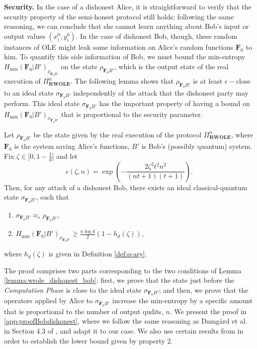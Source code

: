 \noindent\textbf{Security.} In the case of a dishonest Alice, it is straightforward to verify that the security property of the semi-honest protocol still holds; following the same reasoning, we can conclude that she cannot learn anything about Bob's input or output values $(x^0_i, y^0_i)$.  In the case of dishonest Bob, though, these random instances of OLE might leak some information on Alice's random functions $\mathbf{F}_0$ to him. To quantify this  side information of Bob, we must  bound the min-entropy $H_{\min}(\mathbf{F}_0|B')_{\rho_{\mathbf{F}_0 B'}}$ on the state $\rho_{\mathbf{F}_0 B'}$, which is the output state of the real execution of  $\Pi^n_{\textbf{RWOLE}}$. The following lemma shows that  $\rho_{\mathbf{F}_0 B'}$  is at least $\epsilon-$close to an ideal state $\sigma_{\mathbf{F}_0 B'}$ independently of the attack that the dishonest party may perform. This ideal state $\sigma_{\mathbf{F}_0 B'}$ has the important property of having a bound on $H_{\min}(\mathbf{F}_0|B')_{\sigma_{\mathbf{F}_0 B'}}$ that is proportional to the security parameter. 
\begin{lemma}
\label{lemma:wrole_dishonest_bob}

Let $\rho_{\mathbf{F}_0 B'}$ be the state given by the real execution of the protocol $\Pi^n_{\textbf{RWOLE}}$, where $\mathbf{F}_0$ is the system saving Alice's functions, $B'$ is Bob's (possibly quantum) system. Fix $\zeta \in ]0, 1-\frac{1}{d}]$ and let 
$$\epsilon(\zeta, n) = \exp( -\frac{2 \zeta^2t^2n^2}{(nt+1)(t+1)}).$$
Then, for any attack of a dishonest Bob, there exists an ideal classical-quantum state $\sigma_{\mathbf{F}_0 B'}$, such that

\begin{enumerate}
    \item $ \sigma_{\mathbf{F}_0 B'} \approx_{\epsilon} \rho_{\mathbf{F}_0 B'}$,
    \item $ H_{\min}( \mathbf{F}_0 | B' )_{\sigma_{\mathbf{F}_0 B'}} \geq \frac{n\log d}{2}(1 - h_d(\zeta)) $,
\end{enumerate}
where $h_d(\zeta)$ is given in Definition \ref{def:q-ary}.

\end{lemma}
The proof comprises two parts corresponding to the two conditions of Lemma \ref{lemma:wrole_dishonest_bob}: first, we prove that the state just before the \textit{Computation Phase} is close to the ideal state $\sigma_{\mathbf{F}_0 B'}$; and then, we prove that the operators applied by Alice to $\sigma_{\mathbf{F}_0 B'}$ increase the min-entropy by a specific amount that is proportional to the number of output qudits, $n$. We present the proof in \ref{app:proofBobdishonest}, where we follow the same reasoning as Damg\r{a}rd et al. in Section 4.3 of \cite{DFLSS09}, and adapt it to our case.  We also use certain results from \cite{Dupuis2015} in order to establish the lower bound given by property 2.


